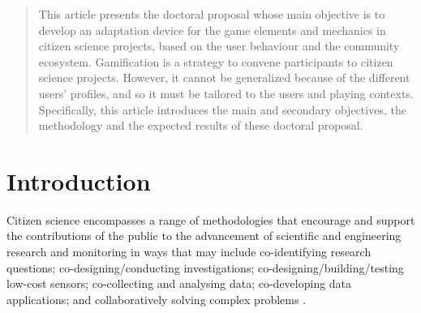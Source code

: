 \documentclass[sigconf]{acmart}
\begin{document}



\begin{abstract}
This article presents the doctoral proposal whose main objective is to develop an adaptation device for the game elements and mechanics in citizen science projects, based on the user behaviour and the community ecosystem.  Gamification is a strategy to convene participants to citizen science projects. However, it cannot be  generalized  because  of  the  different  users’  profiles,  and  so  it  must be tailored to the users and playing contexts. Specifically, this article introduces the main and secondary objectives, the methodology and the expected results of these doctoral proposal.
\end{abstract}
\maketitle


\section{Introduction}

Citizen science encompasses a range of methodologies that encourage and support the contributions of the public to the advancement of scientific and engineering research and monitoring in ways that may include co-identifying research questions; co-designing/conducting investigations; co-designing/building/testing low-cost sensors; co-collecting and analysing data; co-developing data applications; and collaboratively solving complex problems \cite{vohland_science_2021}.


\end{document}
